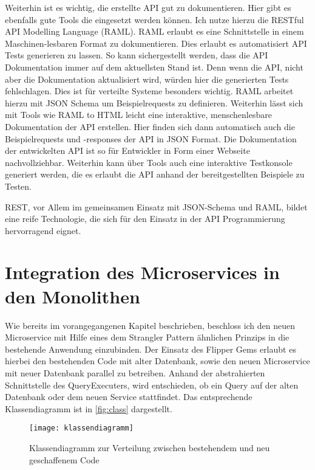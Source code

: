 Weiterhin ist es wichtig, die erstellte API gut zu dokumentieren. Hier gibt es ebenfalls gute Tools die eingesetzt werden können. Ich nutze hierzu die RESTful API Modelling Language (RAML)\cite{raml}. RAML erlaubt es eine Schnittstelle in einem Maschinen-lesbaren Format zu dokumentieren. Dies erlaubt es automatisiert API Tests generieren zu lassen. So kann sichergestellt werden, dass die API Dokumentation immer auf dem aktuellsten Stand ist. Denn wenn die API, nicht aber die Dokumentation aktualisiert wird, würden hier die generierten Tests fehlschlagen. Dies ist für verteilte Systeme besonders wichtig. RAML arbeitet hierzu mit JSON Schema um Beispielrequests zu definieren. Weiterhin lässt sich mit Tools wie RAML to HTML\cite{raml2html} leicht eine interaktive, menschenlesbare Dokumentation der API erstellen. Hier finden sich dann automatisch auch die Beispielrequests und -responses der API in JSON Format. Die Dokumentation der entwickelten API ist so für Entwickler in Form einer Webseite\cite{prophetdoku} nachvollziehbar. 
Weiterhin kann über Tools\cite{ramlconsoletool} auch eine interaktive Testkonsole generiert werden, die es erlaubt die API anhand der bereitgestellten Beispiele zu Testen.

REST, vor Allem im gemeinsamen Einsatz mit JSON-Schema und RAML, bildet eine reife Technologie, die sich für den Einsatz in der API Programmierung hervorragend eignet.


\section{Integration des Microservices in den Monolithen}
Wie bereits im vorangegangenen Kapitel beschrieben, beschloss ich den neuen Microservice mit Hilfe eines dem Strangler Pattern ähnlichen Prinzips in die bestehende Anwendung einzubinden.
Der Einsatz des Flipper Gems erlaubt es hierbei den bestehenden Code mit alter Datenbank, sowie den neuen Microservice mit neuer Datenbank parallel zu betreiben. Anhand der abstrahierten Schnittstelle des QueryExecuters, wird entschieden, ob ein Query auf der alten Datenbank oder dem neuen Service stattfindet. Das entsprechende Klassendiagramm ist in \autoref{fig:class} dargestellt.
\begin{figure}[!ht]
    \centering
    \caption{Klassendiagramm zur Verteilung zwischen bestehendem und neu geschaffenem Code}
    \label{fig:class}
    \texttt{[image: klassendiagramm]}
\end{figure}

